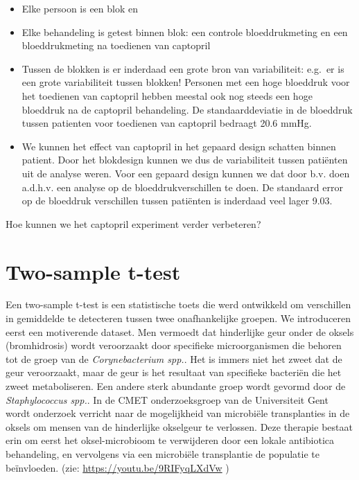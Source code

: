 \documentclass[
  12pt,dutch,coursenotes]{book}
\theoremstyle{definition}
\theoremstyle{definition}
\theoremstyle{definition}
\theoremstyle{definition}
\theoremstyle{remark}
\begin{document}
\begin{itemize}
\item
  Elke persoon is een blok en
\item
  Elke behandeling is getest binnen blok: een controle bloeddrukmeting en een bloeddrukmeting na toedienen van captopril
\item
  Tussen de blokken is er inderdaad een grote bron van variabiliteit: e.g.~er is een grote variabiliteit tussen blokken! Personen met een hoge bloeddruk voor het toedienen van captopril hebben meestal ook nog steeds een hoge bloeddruk na de captopril behandeling. De standaarddeviatie in de bloeddruk tussen patienten voor toedienen van captopril bedraagt 20.6 mmHg.
\item
  We kunnen het effect van captopril in het gepaard design schatten binnen patient. Door het blokdesign kunnen we dus de variabiliteit tussen patiënten uit de analyse weren. Voor een gepaard design kunnen we dat door b.v. doen a.d.h.v. een analyse op de bloeddrukverschillen te doen. De standaard error op de bloeddruk verschillen tussen patiënten is inderdaad veel lager 9.03.
\end{itemize}

Hoe kunnen we het captopril experiment verder verbeteren?

\hypertarget{two-sample-t-test}{%
\section{Two-sample t-test}\label{two-sample-t-test}}

Een two-sample t-test is een statistische toets die werd ontwikkeld om verschillen in gemiddelde te detecteren tussen twee onafhankelijke groepen. We introduceren eerst een motiverende dataset.
Men vermoedt dat hinderlijke geur onder de oksels (bromhidrosis) wordt veroorzaakt door specifieke microorganismen die behoren tot de groep van de \emph{Corynebacterium spp.}. Het is immers niet het zweet dat de geur veroorzaakt, maar de geur is het resultaat van specifieke bacteriën die het zweet metaboliseren. Een andere sterk abundante groep wordt gevormd door de \emph{Staphylococcus spp.}. In de CMET onderzoeksgroep van de Universiteit Gent wordt onderzoek verricht naar de mogelijkheid van microbiële transplanties in de oksels om mensen van de hinderlijke okselgeur te verlossen. Deze therapie bestaat erin om eerst het oksel-microbioom te verwijderen door een lokale antibiotica behandeling, en vervolgens via een microbiële transplantie de populatie te beïnvloeden. (zie: \url{https://youtu.be/9RIFyqLXdVw} )
\end{document}
